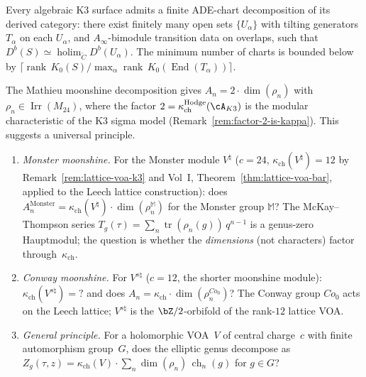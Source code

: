 \begin{conjecture}
\label{conj:ade-chart-k3}
\ClaimStatusConjectured
{}
Every algebraic K3 surface admits a finite ADE-chart
decomposition of its derived category: there exist finitely
many open sets $\{U_\alpha\}$ with tilting generators
$T_\alpha$ on each $U_\alpha$, and
$A_\infty$-bimodule transition data on overlaps, such that
$D^b(S) \simeq \operatorname{holim}_{\check{C}} D^b(U_\alpha)$.
The minimum number of charts is bounded below by
$\lceil \operatorname{rank}\,K_0(S) / \max_\alpha
\operatorname{rank}\,K_0(\operatorname{End}(T_\alpha)) \rceil$.
\end{conjecture}

\begin{openproblem}
\label{op:programme-b-moonshine}
The Mathieu moonshine decomposition gives
$A_n = 2 \cdot \dim(\rho_n)$ with
$\rho_n \in \operatorname{Irr}(M_{24})$, where the
factor $2 = \kappa_{\mathrm{ch}}^{\mathrm{Hodge}}(\cA_{K3})$ is the modular characteristic
of the K3 sigma model
(Remark~\ref{rem:factor-2-is-kappa}).
This suggests a universal principle.
\begin{enumerate}[label=\textup{(\roman*)}]
\item \emph{Monster moonshine.} For the Monster module
 $V^\natural$ ($c = 24$, $\kappa_{\mathrm{ch}}(V^\natural) = 12$ by
 Remark~\ref{rem:lattice-voa-k3} and
 Vol~I, Theorem~\ref{thm:lattice-voa-bar}, applied to the
 Leech lattice construction):
 does $A_n^{\text{Monster}} = \kappa_{\mathrm{ch}}(V^\natural) \cdot
 \dim(\rho_n^{\mathbb{M}})$ for the Monster group
 $\mathbb{M}$?
 The McKay--Thompson series $T_g(\tau) =
 \sum_n \operatorname{tr}(\rho_n(g))\,q^{n-1}$ is a
 genus-zero Hauptmodul; the question is whether the
 \emph{dimensions} (not characters) factor through~$\kappa_{\mathrm{ch}}$.
\item \emph{Conway moonshine.} For $V^{s\natural}$
 ($c = 12$, the shorter moonshine module):
 $\kappa_{\mathrm{ch}}(V^{s\natural}) = ?$ and does
 $A_n = \kappa_{\mathrm{ch}} \cdot \dim(\rho_n^{Co_0})$?
 The Conway group $Co_0$ acts on the Leech lattice;
 $V^{s\natural}$ is the $\bZ/2$-orbifold of the
 rank-$12$ lattice VOA.
\item \emph{General principle.} For a holomorphic VOA~$V$
 of central charge~$c$ with finite automorphism group~$G$,
 does the elliptic genus decompose as
 $Z_g(\tau,z) = \kappa_{\mathrm{ch}}(V) \cdot \sum_n
 \dim(\rho_n)\,\operatorname{ch}_n(g)$ for $g \in G$?
\end{enumerate}
\end{openproblem}

